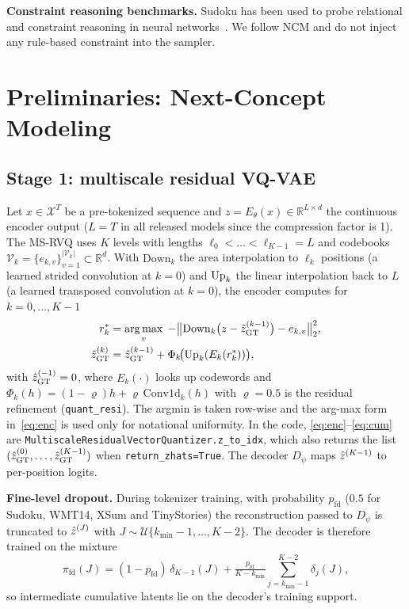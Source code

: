 \textbf{Constraint reasoning benchmarks.} Sudoku has been used to probe relational and constraint reasoning in neural networks~\citep{palm2018rrn,wang2019satnet}. We follow NCM and do not inject any rule-based constraint into the sampler.

\section{Preliminaries: Next-Concept Modeling}
\label{sec:prelim}
\subsection{Stage 1: multiscale residual VQ-VAE}
Let $x\in\mathcal{X}^{T}$ be a pre-tokenized sequence and $z=E_\theta(x)\in\mathbb{R}^{L\times d}$ the continuous encoder output ($L=T$ in all released models since the compression factor is 1). The MS-RVQ uses $K$ levels with lengths $\ell_0<\dots<\ell_{K-1}=L$ and codebooks $\mathcal{V}_k=\{e_{k,v}\}_{v=1}^{|\mathcal{V}_k|}\subset\mathbb{R}^d$. With $\mathrm{Down}_k$ the area interpolation to $\ell_k$ positions (a learned strided convolution at $k=0$) and $\mathrm{Up}_k$ the linear interpolation back to $L$ (a learned transposed convolution at $k=0$), the encoder computes for $k=0,\dots,K-1$
\begin{align}
r^\ast_{k} &= \operatorname*{arg\,max}_{v}\; -\big\|\mathrm{Down}_k\big(z-\hat{z}^{(k-1)}_{\mathrm{GT}}\big)-e_{k,v}\big\|_2^2, \label{eq:enc}\\
\hat{z}^{(k)}_{\mathrm{GT}} &= \hat{z}^{(k-1)}_{\mathrm{GT}} + \Phi_k\!\big(\mathrm{Up}_k(E_k(r^\ast_k))\big), \label{eq:cum}
\end{align}
with $\hat{z}^{(-1)}_{\mathrm{GT}}=0$, where $E_k(\cdot)$ looks up codewords and $\Phi_k(h)=(1-\varrho)h+\varrho\,\mathrm{Conv1d}_k(h)$ with $\varrho=0.5$ is the residual refinement (\texttt{quant\_resi}). The argmin is taken row-wise and the arg-max form in~\eqref{eq:enc} is used only for notational uniformity. In the code, \eqref{eq:enc}--\eqref{eq:cum} are \texttt{MultiscaleResidualVectorQuantizer.z\_to\_idx}, which also returns the list $(\hat{z}^{(0)}_{\mathrm{GT}},\dots,\hat{z}^{(K-1)}_{\mathrm{GT}})$ when \texttt{return\_zhats=True}. The decoder $D_\psi$ maps $\hat{z}^{(K-1)}$ to per-position logits.

\textbf{Fine-level dropout.} During tokenizer training, with probability $p_{\mathrm{fd}}$ ($0.5$ for Sudoku, WMT14, XSum and TinyStories) the reconstruction passed to $D_\psi$ is truncated to $\hat{z}^{(J)}$ with $J\sim\mathcal{U}\{k_{\min}-1,\dots,K-2\}$. The decoder is therefore trained on the mixture
\begin{equation}
\pi_{\mathrm{fd}}(J) = (1-p_{\mathrm{fd}})\,\delta_{K-1}(J) + \tfrac{p_{\mathrm{fd}}}{K-k_{\min}}\textstyle\sum_{j=k_{\min}-1}^{K-2}\delta_j(J), \label{eq:finedrop}
\end{equation}
so intermediate cumulative latents lie on the decoder's training support.

